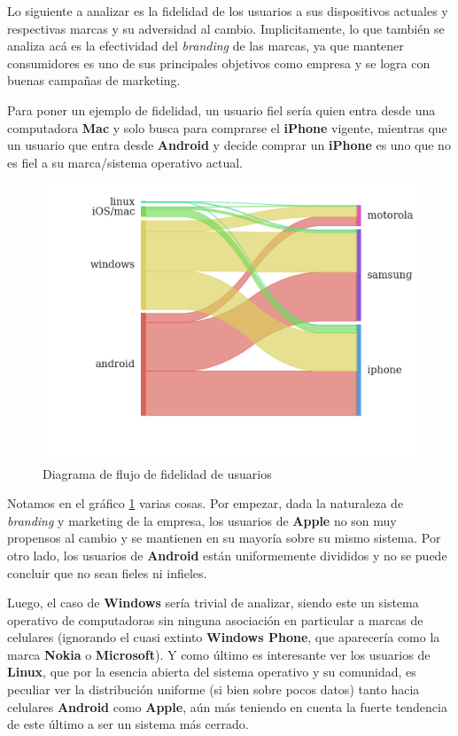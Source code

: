 \documentclass[a4paper]{article}
\begin{document}
Lo siguiente a analizar es la fidelidad de los usuarios a sus dispositivos actuales y respectivas marcas y su adversidad al cambio. Implicitamente, lo que también se analiza acá es la efectividad del \textit{branding} de las marcas, ya que mantener consumidores es uno de sus principales objetivos como empresa y se logra con buenas campañas de marketing.

Para poner un ejemplo de fidelidad, un usuario fiel sería quien entra desde una computadora \textbf{Mac} y solo busca para comprarse el \textbf{iPhone} vigente, mientras que un usuario que entra desde \textbf{Android} y decide comprar un \textbf{iPhone} es uno que no es fiel a su marca/sistema operativo actual.

\begin{figure}[!h]
	\includegraphics[width=\linewidth]{figures/151-os_brands-sankey.png}
	\caption{Diagrama de flujo de fidelidad de usuarios}
	\label{fig:sankey}
\end{figure}

Notamos en el gráfico \ref{fig:sankey} varias cosas. Por empezar, dada la naturaleza de \textit{branding} y marketing de la empresa, los usuarios de \textbf{Apple} no son muy propensos al cambio y se mantienen en su mayoría sobre su mismo sistema. Por otro lado, los usuarios de \textbf{Android} están uniformemente divididos y no se puede concluir que no sean fieles ni infieles. 

Luego, el caso de \textbf{Windows} sería trivial de analizar, siendo este un sistema operativo de computadoras sin ninguna asociación en particular a marcas de celulares (ignorando el cuasi extinto \textbf{Windows Phone}, que aparecería como la marca \textbf{Nokia} o \textbf{Microsoft}). Y como último es interesante ver los usuarios de \textbf{Linux}, que por la esencia abierta del sistema operativo y su comunidad, es peculiar ver la distribución uniforme (si bien sobre pocos datos) tanto hacia celulares \textbf{Android} como \textbf{Apple}, aún más teniendo en cuenta la fuerte tendencia de este último a ser un sistema más cerrado.
\end{document}

